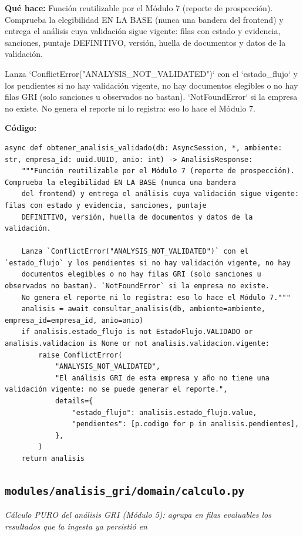 \documentclass[11pt,a4paper]{article}
\begin{document}
\textbf{Qué hace:} Función reutilizable por el Módulo 7 (reporte de prospección). Comprueba la elegibilidad EN LA BASE (nunca una bandera
del frontend) y entrega el análisis cuya validación sigue vigente: filas con estado y evidencia, sanciones, puntaje
DEFINITIVO, versión, huella de documentos y datos de la validación.

Lanza `ConflictError("ANALYSIS\_NOT\_VALIDATED")` con el `estado\_flujo` y los pendientes si no hay validación vigente, no hay
documentos elegibles o no hay filas GRI (solo sanciones u observados no bastan). `NotFoundError` si la empresa no existe.
No genera el reporte ni lo registra: eso lo hace el Módulo 7.

\textbf{Código:}
\begin{lstlisting}
async def obtener_analisis_validado(db: AsyncSession, *, ambiente: str, empresa_id: uuid.UUID, anio: int) -> AnalisisResponse:
    """Función reutilizable por el Módulo 7 (reporte de prospección). Comprueba la elegibilidad EN LA BASE (nunca una bandera
    del frontend) y entrega el análisis cuya validación sigue vigente: filas con estado y evidencia, sanciones, puntaje
    DEFINITIVO, versión, huella de documentos y datos de la validación.

    Lanza `ConflictError("ANALYSIS_NOT_VALIDATED")` con el `estado_flujo` y los pendientes si no hay validación vigente, no hay
    documentos elegibles o no hay filas GRI (solo sanciones u observados no bastan). `NotFoundError` si la empresa no existe.
    No genera el reporte ni lo registra: eso lo hace el Módulo 7."""
    analisis = await consultar_analisis(db, ambiente=ambiente, empresa_id=empresa_id, anio=anio)
    if analisis.estado_flujo is not EstadoFlujo.VALIDADO or analisis.validacion is None or not analisis.validacion.vigente:
        raise ConflictError(
            "ANALYSIS_NOT_VALIDATED",
            "El análisis GRI de esta empresa y año no tiene una validación vigente: no se puede generar el reporte.",
            details={
                "estado_flujo": analisis.estado_flujo.value,
                "pendientes": [p.codigo for p in analisis.pendientes],
            },
        )
    return analisis
\end{lstlisting}

\subsection{\texttt{modules/analisis\_gri/domain/calculo.py}}
\textit{Cálculo PURO del análisis GRI (Módulo 5): agrupa en filas evaluables los resultados que la ingesta ya persistió en}
\end{document}
